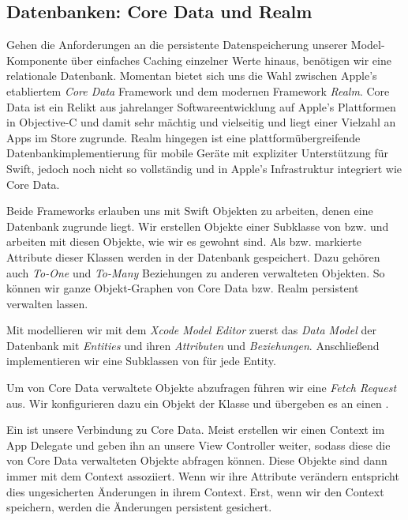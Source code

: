\documentclass[parskip=half, final]{scrreprt}
\begin{document}
\begin{lecture}
\subsection{Datenbanken: Core Data und Realm}\label{sec:coredata}

Gehen die Anforderungen an die persistente Datenspeicherung unserer Model-Komponente über einfaches Caching einzelner Werte hinaus, benötigen wir eine relationale Datenbank. Momentan bietet sich uns die Wahl zwischen Apple's etabliertem \emph{Core Data} Framework und dem modernen Framework \emph{Realm}. Core Data ist ein Relikt aus jahrelanger Softwareentwicklung auf Apple's Plattformen in Objective-C und damit sehr mächtig und vielseitig und liegt einer Vielzahl an Apps im Store zugrunde. Realm hingegen ist eine plattformübergreifende Datenbankimplementierung für mobile Geräte mit expliziter Unterstützung für Swift, jedoch noch nicht so vollständig und in Apple's Infrastruktur integriert wie Core Data.

Beide Frameworks erlauben uns mit Swift Objekten zu arbeiten, denen eine Datenbank zugrunde liegt. Wir erstellen Objekte einer Subklasse von  bzw.  und arbeiten mit diesen Objekte, wie wir es gewohnt sind. Als  bzw.  markierte Attribute dieser Klassen werden in der Datenbank gespeichert. Dazu gehören auch \emph{To-One} und \emph{To-Many} Beziehungen zu anderen verwalteten Objekten. So können wir ganze Objekt-Graphen von Core Data bzw. Realm persistent verwalten lassen.

Mit  modellieren wir mit dem \emph{Xcode Model Editor} zuerst das \emph{Data Model} der Datenbank  mit \emph{Entities} und ihren \emph{Attributen} und \emph{Beziehungen}. Anschließend implementieren wir eine Subklassen von  für jede Entity.


Um von Core Data verwaltete Objekte abzufragen führen wir eine \emph{Fetch Request} aus. Wir konfigurieren dazu ein Objekt der Klasse  und übergeben es an einen .

Ein  ist unsere Verbindung zu Core Data. Meist erstellen wir einen Context im App Delegate und geben ihn an unsere View Controller weiter, sodass diese die von Core Data verwalteten Objekte abfragen können. Diese Objekte sind dann immer mit dem Context assoziiert. Wenn wir ihre Attribute verändern entspricht dies ungesicherten Änderungen in ihrem Context. Erst, wenn wir den Context speichern, werden die Änderungen persistent gesichert.


\end{lecture}
\end{document}
